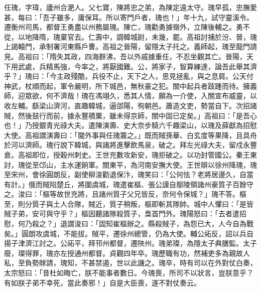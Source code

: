 \begin{pinyinscope}
 任瑰，字瑋，廬州合淝人。父七寶，陳將忠之弟，為陳定遠太守。瑰早孤，忠撫愛甚，每曰：「吾子雖多，庸保耳。所以寄門戶者，瑰也！」年十九，試守靈溪令。遷衡州司馬，都督王勇盡以州務屬瑰。陳亡，瑰勸勇據嶺外，立陳後輔之。勇不從，以地降隋，瑰棄官去。仁壽中，調韓城尉，未幾，罷。高祖討捕於汾、晉，瑰上謁轅門，承制署河東縣戶曹。高祖之晉陽，留隱太子托之。義師起，瑰至龍門請見。高祖曰：「隋失其政，四海群沸，吾以外戚據重任，不忍坐觀其亡。晉陽，天下用武處，兵精馬強，今率之，將厭國難。公，將家子，智算練達，論吾此舉其濟乎？」瑰曰：「今主政殘酷，兵役不止，天下之人，思見拯亂，與之息肩。公天付神武，杖順而起，軍令嚴明，所下城邑，無秋豪之犯。關中起兵者跂踵而待。擁義師，迎眾欲，何不濟哉！瑰在馮翊久，悉其人情，願為一介使，入關宣布威靈，以收左輔。繇梁山濟河，直趣韓城，逼郃陽，徇朝邑。蕭造文吏，勢當自下。次招諸賊，然後鼓行而前，據永豐積粟，雖未得京師，關中固已定矣。」高祖曰：「是吾心也！」乃授銀青光祿大夫。遣陳演壽、史大奈步騎六千趣梁山，以瑰及薛獻為招慰大使。高祖謂演壽曰：「閫外事與任瑰籌之。」既而賊孫華、白玄度等果降，且具舟於河以濟師。瑰行說下韓城，與諸將進擊飲馬泉，破之。拜左光祿大夫，留戍永豐倉。高祖即位，授穀州刺史。王世充數攻新安，瑰拒破之。以功封管國公。秦王東討，瑰從至邙山，主水運餉軍。關東平，為河南安撫大使。王世辯以徐州降瑰，瑰至宋州，會徐圓朗反，副使柳浚勸退保汴，瑰笑曰：「公何怯？老將居邊久，自當有計。」俄而賊陷楚丘，將圍虞城，瑰遣崔樞、張公謹自鄢陵領諸州豪質子百餘守之。浚曰：「樞等故世充將，且諸州質子父兄皆反，奈何令保城？」瑰不答。樞至，則分質子與土人合隊，賊近，質子稍叛，樞即斬其隊帥。城中人懼曰：「是皆賊子弟，安可與守乎？」樞因聽諸隊殺質子，梟首門外。瑰陽怒曰：「去者遣招慰，何乃殺之？」退謂浚曰：「固知崔樞辦之。縣殺賊子，為怨已大，人今自為戰矣。」圓朗攻虞城，不能拔。賊平，遷徐州總管，仍為大使。輔公祏反，詔以兵自揚子津濟江討之。公祏平，拜邗州都督，遷陜州。瑰弟璨，為隱太子典膳監。太子廢，璨得罪，瑰亦左授通州都督。貞觀四年卒。瑰歷職有功，然補吏多為親故人私，至負勢賕請，瑰知，不甚禁遏，世以此譏之。瑰卒，時有司以在外對仗白奏，太宗怒曰：「昔杜如晦亡，朕不能事者數日。今瑰喪，所司不以狀言，豈朕意乎？有如朕子弟不幸死，當此奏邪！」自是大臣喪，遂不對仗奏云。




\end{pinyinscope}
